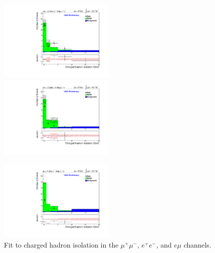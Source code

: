 \begin{figure}
\includegraphics[width=0.5\textwidth]{Plots/Fits/TTbarPhotonAnalysis/MuMu/central/Fit.pdf}
\includegraphics[width=0.5\textwidth]{Plots/Fits/TTbarPhotonAnalysis/EE/central/Fit.pdf}\\
\begin{center}
\includegraphics[width=0.5\textwidth]{Plots/Fits/TTbarPhotonAnalysis/EMu/central/Fit.pdf}
\end{center}
\caption{Fit to charged hadron isolation in the $\mu^{+}\mu^{-}$, $e^{+}e^{-}$, and $e\mu$ channels.}
\label{fig-fits}
\end{figure}



